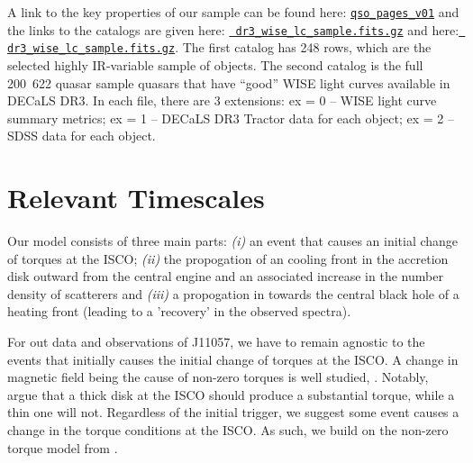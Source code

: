 \documentclass[11pt,a4paper]{article}
\begin{document}

A link to the key properties of our sample can be found here:
\href{http://portal.nersc.gov/project/cosmo/temp/ameisner/qso\_pages\_v01/}
{\tt qso\_pages\_v01} and the links to the catalogs are given here:
\href{http://portal.nersc.gov/project/cosmo/temp/ameisner/dr3_wise_lc_sample.fits.gz}{{\tt
dr3\_wise\_lc\_sample.fits.gz}} and here:
\href{http://portal.nersc.gov/project/cosmo/temp/ameisner/dr3_wise_lc_metrics_all_qso.fits.gz}{{\tt
dr3\_wise\_lc\_sample.fits.gz}}.  The first catalog has 248 rows,
which are the selected highly IR-variable sample of objects.  The
second catalog is the full \hbox{200 622} quasar sample quasars that
have ``good'' WISE light curves available in DECaLS DR3. In each file,
there are 3 extensions: ex = 0 -- WISE light curve summary metrics; ex
= 1 -- DECaLS DR3 Tractor data for each object; ex = 2 -- SDSS data
for each object.



\section*{Relevant Timescales}

Our model consists of three main parts: {\it (i)} an event that causes
an initial change of torques at the ISCO; {\it (ii)} the propogation
of an cooling front in the accretion disk outward from the central
engine and an associated increase in the number density of scatterers
and {\it (iii)} a propogation in towards the central black hole of a
heating front (leading to a 'recovery' in the observed spectra).

For out data and observations of J11057, we have to remain agnostic to
the events that initially causes the initial change of torques at the
ISCO.  A change in magnetic field being the cause of non-zero torques
is well studied, \citet[see e.g.,][]{Krolik1999, Gammie1999,
Agol_Krolik2000, Reynolds_Armitage2001}.  Notably,
\citet{Afshordi_Paczynski2003} argue that a thick disk at the ISCO
should produce a substantial torque, while a thin one will not.
Regardless of the initial trigger, we suggest some event causes 
a change in the torque conditions at the ISCO. As such, we build 
on the non-zero torque model from \citet{Zimmerman2005}. 
\end{document}
